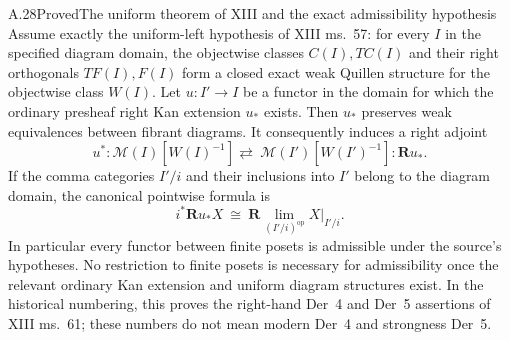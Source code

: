 \begin{claim}{A.28}{Proved}{The uniform theorem of XIII and the exact admissibility hypothesis}
Assume exactly the uniform-left hypothesis of XIII ms.~57: for every $I$ in the specified diagram domain, the objectwise classes $C(I),TC(I)$ and their right orthogonals $TF(I),F(I)$ form a closed exact weak Quillen structure for the objectwise class $W(I)$. Let $u:I'\to I$ be a functor in the domain for which the ordinary presheaf right Kan extension $u_*$ exists. Then $u_*$ preserves weak equivalences between fibrant diagrams. It consequently induces a right adjoint
\[
u^*: \mathcal M(I)[W(I)^{-1}] \rightleftarrows\
\mathcal M(I')[W(I')^{-1}]:\mathbf R u_*.
\]
If the comma categories $I'/i$ and their inclusions into $I'$ belong to the diagram domain, the canonical pointwise formula is
\[
i^*\mathbf R u_*X\ \cong\ \mathbf R\!\lim_{(I'/i)^{\mathrm{op}}}X|_{I'/i}.
\]
In particular every functor between finite posets is admissible under the source's hypotheses. No restriction to finite posets is necessary for admissibility once the relevant ordinary Kan extension and uniform diagram structures exist. In the historical numbering, this proves the right-hand Der~4 and Der~5 assertions of XIII ms.~61; these numbers do not mean modern Der~4 and strongness Der~5.
\end{claim}
